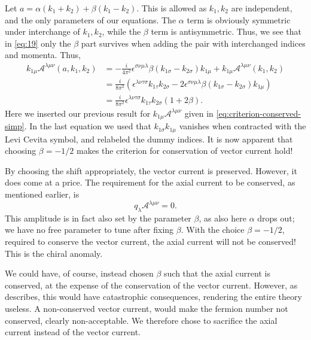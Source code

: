 Let $a=\alpha (k_1+k_2) + \beta (k_1-k_2)$.
This is allowed as $k_1, k_2$ are independent, and the only parameters of our equations.
The $\alpha$ term is obviously symmetric under interchange of $k_1, k_2$, while the $\beta$ term is antisymmetric.
Thus, we see that in \cref{eq:19} only the $\beta $ part survives when adding the pair with interchanged indices and momenta.
Thus,
\begin{align}
  k_{1\mu }\mathcal{A}^{\lambda \mu \nu }(a, k_1, k_2) &=
                                                         -\frac{i}{4\pi^2} \epsilon ^{\sigma \nu \mu \lambda } \beta (k_{1\sigma } - k_{2\sigma })k_{1\mu } + k_{1\mu }\mathcal{A}^{\lambda \mu \nu }(k_1, k_2)\\
                                                       &= \frac{i}{8\pi^2} \left(
                                                         \epsilon ^{\lambda \nu \tau \sigma }k_{1\tau }k_{2\sigma } - 2 \epsilon ^{\sigma \nu \mu \lambda } \beta (k_{1\sigma } - k_{2\sigma })k_{1\mu }\right)\\
  &= \frac{i}{8\pi^2} \epsilon ^{\lambda \nu \tau \sigma } k_{1\tau }k_{2\sigma } (1+ 2\beta ).
\end{align}
Here we inserted our previous result for $k_{1\mu }\mathcal{A}^{\lambda \mu \nu }$ given in \cref{eq:criterion-conserved-simp}.
In the last equation we used that $k_{1\sigma }k_{1\mu }$ vanishes when contracted with the Levi Cevita symbol, and relabeled the dummy indices.
It is now  apparent that choosing $\beta = -1 / 2$ makes the criterion for conservation of vector current hold!

By choosing the shift appropriately, the vector current is preserved.
However, it does come at a price.
The requirement for the axial current to be conserved, as mentioned earlier, is
\[
  q_{\lambda } \mathcal{A}^{\lambda  \mu  \nu } = 0.
\]
This amplitude is in fact also set by the parameter $\beta $, as also here $\alpha $ drops out;
we have no free parameter  to tune after fixing $\beta $.
With the choice $\beta  = -1 / 2$, required to conserve the vector current, the axial current will not be conserved!
This is the chiral anomaly.

We could have, of course, instead chosen $\beta $ such that the axial current is conserved, at the expense of the conservation of the vector current.
However, as~\citeauthor{zeeQuantumFieldTheory2010}~\cite{zeeQuantumFieldTheory2010} describes, this would have catastrophic consequences, rendering the entire theory useless.
A non-conserved vector current, would make the fermion number not conserved, clearly non-acceptable.
We therefore chose to sacrifice the axial current instead of the vector current.


